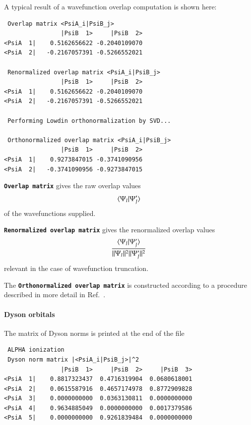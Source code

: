 \documentclass[a4paper,10pt,DIV=15,openany,twoside=false]{scrbook}
\newcommand{\ttt}[1]{\textbf{\texttt{#1}}}
\newenvironment{example}{
  \setlength{\OuterFrameSep}{3pt}
  \vspace{0mm}
  \definecolor{shadecolor}{HTML}{E4F4FF}
  \begin{shaded}
}{
  \end{shaded}
}
\begin{document}
A typical result of a wavefunction overlap computation is shown here:
\begin{example}
\begin{verbatim}
 Overlap matrix <PsiA_i|PsiB_j>
                |PsiB  1>     |PsiB  2>
<PsiA  1|    0.5162656622 -0.2040109070
<PsiA  2|   -0.2167057391 -0.5266552021

 Renormalized overlap matrix <PsiA_i|PsiB_j>
                |PsiB  1>     |PsiB  2>
<PsiA  1|    0.5162656622 -0.2040109070
<PsiA  2|   -0.2167057391 -0.5266552021

 Performing Lowdin orthonormalization by SVD...

 Orthonormalized overlap matrix <PsiA_i|PsiB_j>
                |PsiB  1>     |PsiB  2>
<PsiA  1|    0.9273847015 -0.3741090956
<PsiA  2|   -0.3741090956 -0.9273847015
\end{verbatim}
\end{example}

\ttt{Overlap matrix} gives the raw overlap values
\begin{equation}
  \braket{\Psi_I|\Psi_J'}
\end{equation}
of the wavefunctions supplied.

\ttt{Renormalized overlap matrix} gives the renormalized overlap values
\begin{equation}
  \frac{  \braket{\Psi_I|\Psi_J'}  }{  ||\Psi_I||^2  ||\Psi_J'||^2}
\end{equation}
relevant in the case of wavefunction truncation.

The \ttt{Orthonormalized overlap matrix} is constructed according to a procedure described in more detail in Ref.~\cite{Plasser2016JCTC}.



\paragraph{Dyson orbitals}
The matrix of Dyson norms is printed at the end of the file

\begin{example}
\begin{verbatim}
 ALPHA ionization
 Dyson norm matrix |<PsiA_i|PsiB_j>|^2                                          
                |PsiB  1>     |PsiB  2>     |PsiB  3>                           
<PsiA  1|    0.8817323437  0.4716319904  0.0680618001                           
<PsiA  2|    0.0615587916  0.4657174978  0.8772909828                           
<PsiA  3|    0.0000000000  0.0363130811  0.0000000000                           
<PsiA  4|    0.9634885049  0.0000000000  0.0017379586                           
<PsiA  5|    0.0000000000  0.9261839484  0.0000000000 
\end{verbatim}
\end{example}
\end{document}
